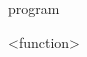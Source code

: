 \documentclass[convert={outext=.png}]{standalone}
\begin{document}
\begin{málrit}{program}
	\begin{rep}
		<function>
	\end{rep}
\end{málrit}
\end{document}
